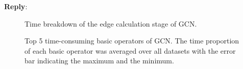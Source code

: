 \documentclass[12pt]{article}
\newenvironment{reply}
   {\medskip \noindent \textbf{Reply}:\  }
   {\medskip}
\begin{document}
\begin{reply}
    \begin{figure}[H]
            \caption{Time breakdown of the edge calculation stage of GCN.}
            \label{fig:compare_time_breakdown_of_edge_calculation}
     \end{figure}
     
     \begin{figure}[H]
             \caption{Top 5 time-consuming basic operators of GCN. The time proportion of each basic operator was averaged over all datasets with the error bar indicating the maximum and the minimum.}
             \label{fig:compare_basic_operators}
      \end{figure}
     


\end{reply}
\end{document}
